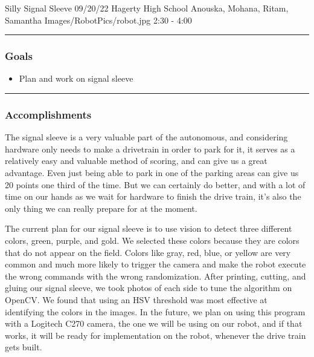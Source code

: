 \insertmeeting 
	{Silly Signal Sleeve} 
	{09/20/22}
	{Hagerty High School}
	{Anouska, Mohana, Ritam, Samantha}
	{Images/RobotPics/robot.jpg}
	{2:30 - 4:00}
	
\noindent\hfil\rule{\textwidth}{.4pt}\hfil
\subsubsection*{Goals}
\begin{itemize}
    \item Plan and work on signal sleeve

\end{itemize} 

\noindent\hfil\rule{\textwidth}{.4pt}\hfil

\subsubsection*{Accomplishments}
The signal sleeve is a very valuable part of the autonomous, and considering hardware only needs to make a drivetrain in order to park for it, it serves as a relatively easy and valuable method of scoring, and can give us a great advantage. Even just being able to park in one of the parking areas can give us 20 points one third of the time. But we can certainly do better, and with a lot of time on our hands as we wait for hardware to finish the drive train, it's also the only thing we can really prepare for at the moment.

The current plan for our signal sleeve is to use vision to detect three different colors, green, purple, and gold. We selected these colors because they are colors that do not appear on the field. Colors like gray, red, blue, or yellow are very common and much more likely to trigger the camera and make the robot execute the wrong commands with the wrong randomization. After printing, cutting, and gluing our signal sleeve, we took photos of each side to tune the algorithm on OpenCV. We found that using an HSV threshold was most effective at identifying the colors in the images. In the future, we plan on using this program with a Logitech C270 camera, the one we will be using on our robot, and if that works, it will be ready for implementation on the robot, whenever the drive train gets built.




